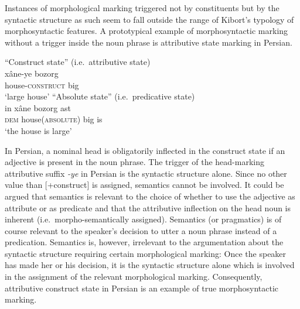 Instances of morphological marking triggered not by constituents but by the syntactic structure as such seem to fall outside the range of Kibort's typology of morphosyntactic features. A prototypical example of morphosyntactic marking without a trigger inside the noun phrase is attributive state marking in Persian.
\begin{exe}
\ex 
{}
\label{persian state}
\begin{xlist}
\ex 
\rm{“Construct state” (i.e.~attributive state)}\\
\gll 	xâne-ye bozorg\\
	house-\textsc{construct} big\\
\glt 	‘large house’
\ex 
\rm{“Absolute state” (i.e.~predicative state)}\\
\gll	in xâne bozorg ast\\
	\textsc{dem} house(\textsc{absolute}) big is\\
\glt	‘the house is large’
\end{xlist}
\end{exe}
In Persian, a nominal head is obligatorily inflected in the construct state if an adjective is present in the noun phrase. The trigger of the head-marking attributive suffix \textit{-ye} in Persian is the syntactic structure alone. Since no other value than [+construct] is assigned, semantics cannot be involved. It could be argued that semantics is relevant to the choice of whether to use the adjective as attribute or as predicate and that the attributive inflection on the head noun is inherent (i.e.~morpho-semantically assigned). Semantics (or pragmatics) is of course relevant to the speaker's decision to utter a noun phrase instead of a predication. Semantics is, however, irrelevant to the argumentation about the syntactic structure requiring certain morphological marking: Once the speaker has made her or his decision, it is the syntactic structure alone which is involved in the assignment of the relevant morphological marking. Consequently, attributive construct state in Persian is an example of true morphosyntactic marking.

